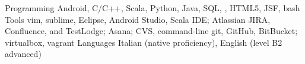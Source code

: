 \begin{cvskills}
  \cvskill
    {Programming}
    {Android, C/C++, Scala, Python, Java, SQL, \LaTeXe{}, HTML5, JSF, bash}
  \cvskill
  {Tools}
  {vim, sublime, Eclipse, Android Studio,
     Scala IDE;
   Atlassian JIRA, Confluence, and
   TestLodge;  Asana;
   CVS, command-line git, GitHub, BitBucket;
   virtualbox, vagrant
  }
  \cvskill
    {Languages}
    {Italian (native proficiency), English 
   (level B2 advanced)}


\end{cvskills}
